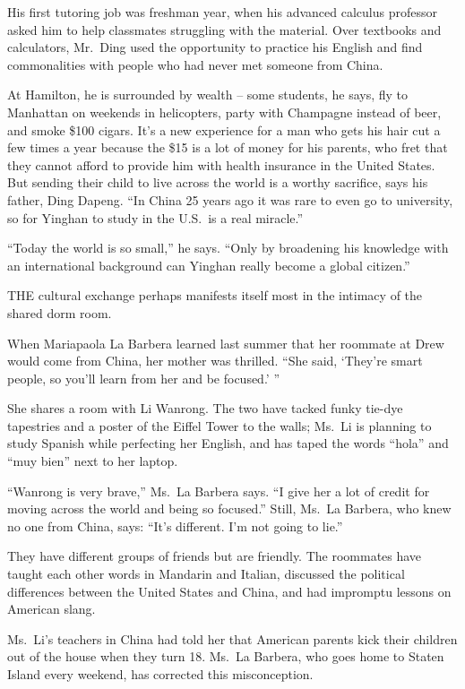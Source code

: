 ﻿\documentclass[12pt]{article}
\begin{document}
His first tutoring job was freshman year, when his advanced calculus professor asked him to help
classmates struggling with the material. Over textbooks and calculators, Mr.~Ding used the
opportunity to practice his English and find commonalities with people who had never met someone
from China.

At Hamilton, he is surrounded by wealth -- some students, he says, fly to Manhattan on weekends in
helicopters, party with Champagne instead of beer, and smoke \$100 cigars. It's a new experience for
a man who gets his hair cut a few times a year because the \$15 is a lot of money for his parents,
who fret that they cannot afford to provide him with health insurance in the United States. But
sending their child to live across the world is a worthy sacrifice, says his father, Ding Dapeng.
``In China 25 years ago it was rare to even go to university, so for Yinghan to study in the U.S.~is
a real miracle.''

``Today the world is so small,'' he says. ``Only by broadening his knowledge with an international
background can Yinghan really become a global citizen.''

THE cultural exchange perhaps manifests itself most in the intimacy of the shared dorm room.

When Mariapaola La Barbera learned last summer that her roommate at Drew would come from China, her
mother was thrilled. ``She said, `They're smart people, so you'll learn from her and be focused.' ''

She shares a room with Li Wanrong. The two have tacked funky tie-dye tapestries and a poster of the
Eiffel Tower to the walls; Ms.~Li is planning to study Spanish while perfecting her English, and has
taped the words ``hola'' and ``muy bien'' next to her laptop.

``Wanrong is very brave,'' Ms.~La Barbera says. ``I give her a lot of credit for moving across the
world and being so focused.'' Still, Ms.~La Barbera, who knew no one from China, says: ``It's
different. I'm not going to lie.''

They have different groups of friends but are friendly. The roommates have taught each other words
in Mandarin and Italian, discussed the political differences between the United States and China,
and had impromptu lessons on American slang.

Ms.~Li's teachers in China had told her that American parents kick their children out of the house
when they turn 18. Ms.~La Barbera, who goes home to Staten Island every weekend, has corrected this
misconception.
\end{document}
